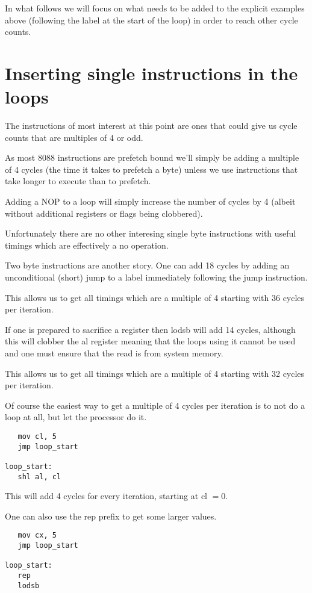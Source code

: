 \documentclass[a4paper,10pt]{amsart}
\begin{document}
In what follows we will focus on what needs to be added to the explicit
examples above (following the label at the start of the loop) in order to reach
other cycle counts.

\section{Inserting single instructions in the loops}

The instructions of most interest at this point are ones that could give us
cycle counts that are multiples of 4 or odd.

As most 8088 instructions are prefetch bound we'll simply be adding a multiple
of 4 cycles (the time it takes to prefetch a byte) unless we use instructions
that take longer to execute than to prefetch.

Adding a NOP to a loop will simply increase the number of cycles by 4 (albeit
without additional registers or flags being clobbered).

Unfortunately there are no other interesing single byte instructions with
useful timings which are effectively a no operation.

Two byte instructions are another story. One can add 18 cycles by adding an
unconditional (short) jump to a label immediately following the jump
instruction.

This allows us to get all timings which are a multiple of 4 starting with 36
cycles per iteration.

If one is prepared to sacrifice a register then lodsb will add 14 cycles,
although this will clobber the al register meaning that the loops using it
cannot be used and one must ensure that the read is from system memory.

This allows us to get all timings which are a multiple of 4 starting with 32
cycles per iteration.

Of course the easiest way to get a multiple of 4 cycles per iteration is to
not do a loop at all, but let the processor do it.

\begin{lstlisting}
   mov cl, 5
   jmp loop_start

loop_start:
   shl al, cl
\end{lstlisting}

This will add 4 cycles for every iteration, starting at cl $= 0$.

One can also use the rep prefix to get some larger values.

\begin{lstlisting}
   mov cx, 5
   jmp loop_start

loop_start:
   rep
   lodsb
\end{lstlisting}
\end{document}

